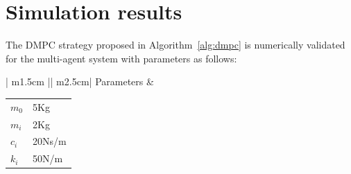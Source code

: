 \documentclass[letterpaper, 10 pt, conference]{ieeeconf}
\begin{document}
\section{Simulation results}
The DMPC strategy proposed in Algorithm~\ref{alg:dmpc} is numerically validated for the multi-agent system with parameters as follows:
 \begin{center}
 	\begin{tabular}{ | m{1.5cm} || m{2.5cm}| } 
 		\hline
 		Parameters & 
 			\begin{center}
 				\begin{tabular}{ m{0.5cm} | m{2cm} } $m_0$ & 5Kg \\ $m_i$ & 2Kg \\ $c_i$ & 20Ns/m \\ $k_i$ & 50N/m \\ 
 				\end{tabular}
 			\end{center} \\
 		\hline	
 	\end{tabular}
 \end{center}
\end{document}

